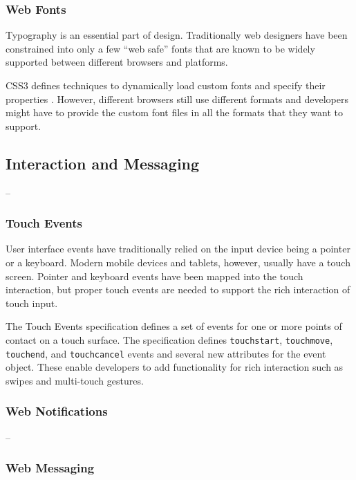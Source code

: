 \subsubsection{Web Fonts}

Typography is an essential part of design. Traditionally web designers
have been constrained into only a few ``web safe'' fonts that are
known to be widely supported between different browsers and platforms.

CSS3 defines techniques to dynamically load custom fonts and specify
their properties \cite{cssfonts}. However, different browsers still
use different formats and developers might have to provide the custom
font files in all the formats that they want to support.

\subsection{Interaction and Messaging}

--

\subsubsection{Touch Events}

User interface events have traditionally relied on the input device
being a pointer or a keyboard. Modern mobile devices and tablets,
however, usually have a touch screen. Pointer and keyboard events have
been mapped into the touch interaction, but proper touch events are
needed to support the rich interaction of touch input.

The Touch Events specification \cite{touchevents} defines a set of
events for one or more points of contact on a touch surface. The
specification defines \texttt{touchstart}, \texttt{touchmove},
\texttt{touchend}, and \texttt{touchcancel} events and several new
attributes for the event object. These enable developers to add
functionality for rich interaction such as swipes and multi-touch
gestures.

\subsubsection{Web Notifications}

--

\subsubsection{Web Messaging}

